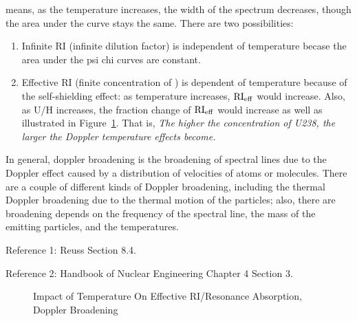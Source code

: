 \documentclass{school-22.211-notes}
\date{February 27, 2012}
\begin{document}
\maketitle

 means, as the temperature increases, the width of the spectrum decreases, though the area under the curve stays the same. There are two possibilities: 
\begin{enumerate}
\item Infinite RI (infinite dilution factor) is independent of temperature becase the area under the psi chi curves are constant. 
\item Effective RI (finite concentration of ) is dependent of temperature because of the self-shielding effect: as temperature increases, $\mathrm{RI}_{\mathrm{eff}}$ would increase. Also, as U/H increases, the fraction change of $\mathrm{RI}_{\mathrm{eff}}$ would increase as well as illustrated in Figure~\ref{Doppler}. That is, \textit{The higher the concentration of U238, the larger the Doppler temperature effects become.}
\end{enumerate}

In general, doppler broadening is the broadening of spectral lines due to the Doppler effect caused by a distribution of velocities of atoms or molecules. There are a couple of different kinds of Doppler broadening, including the thermal Doppler broadening due to the thermal motion of the particles; also, there are broadening depends on the frequency of the spectral line, the mass of the emitting particles, and the temperatures. 

Reference 1: Reuss Section 8.4. 

Reference 2: Handbook of Nuclear Engineering Chapter 4 Section 3. 

\begin{figure}
  \centering
  \caption{Impact of Temperature On Effective RI/Resonance Absorption, Doppler Broadening} \label{Doppler}
\end{figure}
\end{document}
